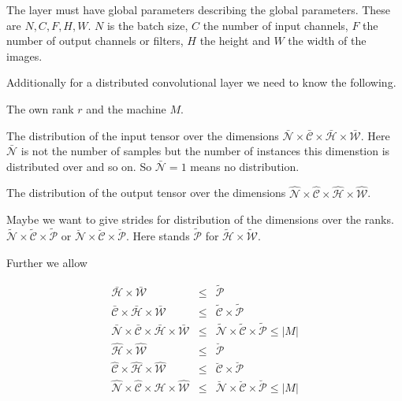 \documentclass{report}
\begin{document}
The layer must have global parameters describing the global parameters.
These are $N, C, F, H, W$. $N$ is the batch size, $C$ the number of input
channels, $F$ the number of output channels or filters, $H$ the height and
$W$ the width of the images.

Additionally for a distributed convolutional layer we need to know the
following.

The own rank $r$ and the machine $M$.

The distribution of the input tensor over the dimensions
$\bar{\mathcal{N}} \times \bar{\mathcal{C}} \times \bar{\mathcal{H}} \times
\bar{\mathcal{W}}$. Here $\bar{\mathcal{N}}$ is not the number of samples
but the number of instances this dimenstion is distributed over and so on. So
$\bar{\mathcal{N}}=1$ means no distribution.

The distribution of the output tensor over the dimensions
$\hat{\mathcal{N}} \times \hat{\mathcal{C}} \times \hat{\mathcal{H}} \times
\hat{\mathcal{W}}$.

Maybe we want to give strides for distribution of the dimensions over the
ranks.
$\tilde{\mathcal{N}} \times \tilde{\mathcal{C}} \times \tilde{\mathcal{P}}$
or $\breve{\mathcal{N}} \times \breve{\mathcal{C}} \times \breve{\mathcal{P}}$.
Here stands
$ \tilde{\mathcal{P}}$ for $\tilde{\mathcal{H}} \times \tilde{\mathcal{W}}$.

Further we allow

\begin{eqnarray}
  \bar{\mathcal{H}} \times \bar{\mathcal{W}} & \leq & \tilde{\mathcal{P}}\\
    \bar{\mathcal{C}} \times  \bar{\mathcal{H}} \times \bar{\mathcal{W}}
  & \leq &
  \tilde{\mathcal{C}} \times  \tilde{\mathcal{P}}
  \\
     \bar{\mathcal{N}} \times \bar{\mathcal{C}} \times  \bar{\mathcal{H}} \times \bar{\mathcal{W}}
  & \leq &
   \tilde{\mathcal{N}} \times \tilde{\mathcal{C}} \times  \tilde{\mathcal{P}}
   \leq |M| \\
     \hat{\mathcal{H}} \times \hat{\mathcal{W}} & \leq & \breve{\mathcal{P}}\\
    \hat{\mathcal{C}} \times  \hat{\mathcal{H}} \times \hat{\mathcal{W}}
  & \leq &
  \breve{\mathcal{C}} \times  \breve{\mathcal{P}}
  \\
     \hat{\mathcal{N}} \times \hat{\mathcal{C}} \times  \hat{\mathcal{H}} \times \hat{\mathcal{W}}
  & \leq &
   \breve{\mathcal{N}} \times \breve{\mathcal{C}} \times  \breve{\mathcal{P}}
  \leq |M|
\end{eqnarray}
\end{document}
